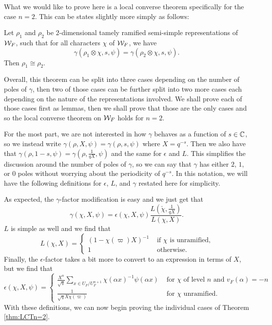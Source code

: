 What we would like to prove here is a local converse theorem specifically for the case $n=2$. This can be states slightly more simply as follows:

\begin{theorem}[Local Converse Theorem on $\cW_F$ with $n=2$]
  \label{thm:LCTn=2}
  Let $\rho_1$ and $\rho_2$ be $2$-dimensional tamely ramified semi-simple representations of $\cW_F$, such that for all characters $\chi$ of $\cW_F$, we have
  \[\gamma(\rho_1 \otimes \chi,s,\psi) = \gamma(\rho_2 \otimes \chi,s,\psi).\]
  Then $\rho_1 \cong \rho_2$.
\end{theorem}

Overall, this theorem can be split into three cases depending on the number of poles of $\gamma$, then two of those cases can be further split into two more cases each depending on the nature of the representations involved. We shall prove each of those cases first as lemmas, then we shall prove that those are the only cases and so the local converse theorem on $\cW_F$ holds for $n=2$.

For the most part, we are not interested in how $\gamma$ behaves as a function of $s \in \mathbb{C}$, so we instead write $\gamma(\rho, X, \psi) = \gamma(\rho,s,\psi)$ where $X = q^{-s}$.
Then we also have that $\gamma(\rho,1-s,\psi) = \gamma(\rho,\frac{1}{qX},\psi)$ and the same for $\epsilon$ and $L$.
This simplifies the discussion around the number of poles of $\gamma$, so we can say that $\gamma$ has either $2$, $1$, or $0$ poles without worrying about the periodicity of $q^{-s}$.
In this notation, we will have the following definitions for $\epsilon$, $L$, and $\gamma$ restated here for simplicity.

As expected, the $\gamma$-factor modification is easy and we just get that \[\gamma(\chi, X, \psi) = \epsilon(\chi, X, \psi) \frac{L(\check{\chi}, \frac{1}{qX})}{L(\chi, X)}.\]
$L$ is simple as well and we find that 
\[L(\chi, X) = \begin{cases} (1 - \chi(\varpi) X)^{-1} & \text{ if } \chi \text{ is unramified,} \\ 1 & \text{ otherwise.} \end{cases}\]
Finally, the $\epsilon$-factor takes a bit more to convert to an expression in terms of $X$, but we find that
\[\displaystyle\epsilon(\chi, X, \psi) = \begin{cases} \frac{X^n}{\sqrt{q}} \sum_{x \in U_F/U_F^{n+1}} \chi(\alpha x)^{-1} \psi(\alpha x) & \text{ for } \chi \text{ of level } n \text{ and } v_F(\alpha) = -n \\ \frac{1}{\sqrt{q}X\chi(\varpi)} & \text{ for } \chi \text{ unramified.}\end{cases}\]
With these definitions, we can now begin proving the individual cases of Theorem \ref{thm:LCTn=2}.

